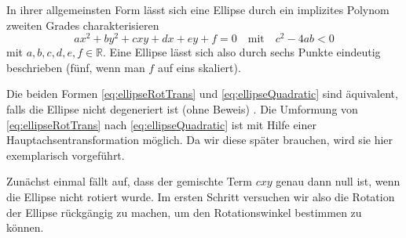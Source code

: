 In ihrer allgemeinsten Form lässt sich eine Ellipse durch ein implizites Polynom zweiten Grades charakterisieren
\begin{equation} \label{eq:ellipseQuadratic}
ax^2 + by^2 + cxy + dx + ey + f = 0 \quad \text{mit}\quad c^2-4ab < 0
\end{equation}
mit $a,b,c,d,e,f \in \mathbb{R}$. Eine Ellipse lässt sich also durch sechs Punkte eindeutig beschrieben (fünf, wenn man $f$ auf eins skaliert).


Die beiden Formen \ref{eq:ellipseRotTrans} und \ref{eq:ellipseQuadratic} sind äquivalent, falls die Ellipse nicht degeneriert ist (ohne Beweis) \cite{Lawrence1972}. Die Umformung von \ref{eq:ellipseRotTrans} nach \ref{eq:ellipseQuadratic} ist mit Hilfe einer Hauptachsentransformation möglich.
Da wir diese später brauchen, wird sie hier exemplarisch vorgeführt.

Zunächst einmal fällt auf, dass der gemischte Term $cxy$ genau dann null ist, wenn die Ellipse nicht rotiert wurde. Im ersten Schritt versuchen wir also die Rotation der Ellipse rückgängig zu machen, um den Rotationswinkel bestimmen zu können.

